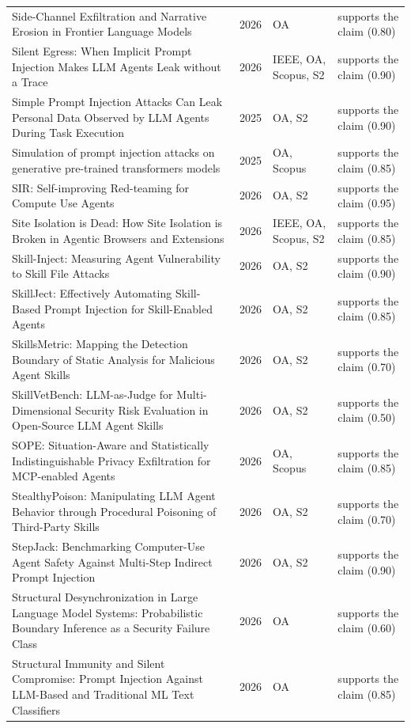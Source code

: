 \begin{longtable}{@{}%
  >{\raggedright\arraybackslash}p{}c%
  >{\raggedright\arraybackslash}p{}%
  >{\raggedright\arraybackslash}p{}@{}}
Side-Channel Exfiltration and Narrative Erosion in Frontier Language Models & 2026 & OA & supports the claim (0.80) \\
Silent Egress: When Implicit Prompt Injection Makes LLM Agents Leak without a Trace & 2026 & IEEE, OA, Scopus, S2 & supports the claim (0.90) \\
Simple Prompt Injection Attacks Can Leak Personal Data Observed by LLM Agents During Task Execution & 2025 & OA, S2 & supports the claim (0.90) \\
Simulation of prompt injection attacks on generative pre-trained transformers models & 2025 & OA, Scopus & supports the claim (0.85) \\
SIR: Self-improving Red-teaming for Compute Use Agents & 2026 & OA, S2 & supports the claim (0.95) \\
Site Isolation is Dead: How Site Isolation is Broken in Agentic Browsers and Extensions & 2026 & IEEE, OA, Scopus, S2 & supports the claim (0.85) \\
Skill-Inject: Measuring Agent Vulnerability to Skill File Attacks & 2026 & OA, S2 & supports the claim (0.90) \\
SkillJect: Effectively Automating Skill-Based Prompt Injection for Skill-Enabled Agents & 2026 & OA, S2 & supports the claim (0.85) \\
SkillsMetric: Mapping the Detection Boundary of Static Analysis for Malicious Agent Skills & 2026 & OA, S2 & supports the claim (0.70) \\
SkillVetBench: LLM-as-Judge for Multi-Dimensional Security Risk Evaluation in Open-Source LLM Agent Skills & 2026 & OA, S2 & supports the claim (0.50) \\
SOPE: Situation-Aware and Statistically Indistinguishable Privacy Exfiltration for MCP-enabled Agents & 2026 & OA, Scopus & supports the claim (0.85) \\
StealthyPoison: Manipulating LLM Agent Behavior through Procedural Poisoning of Third-Party Skills & 2026 & OA, S2 & supports the claim (0.70) \\
StepJack: Benchmarking Computer-Use Agent Safety Against Multi-Step Indirect Prompt Injection & 2026 & OA, S2 & supports the claim (0.90) \\
Structural Desynchronization in Large Language Model Systems: Probabilistic Boundary Inference as a Security Failure Class & 2026 & OA & supports the claim (0.60) \\
Structural Immunity and Silent Compromise: Prompt Injection Against LLM-Based and Traditional ML Text Classifiers & 2026 & OA & supports the claim (0.85) \\

\end{longtable}
